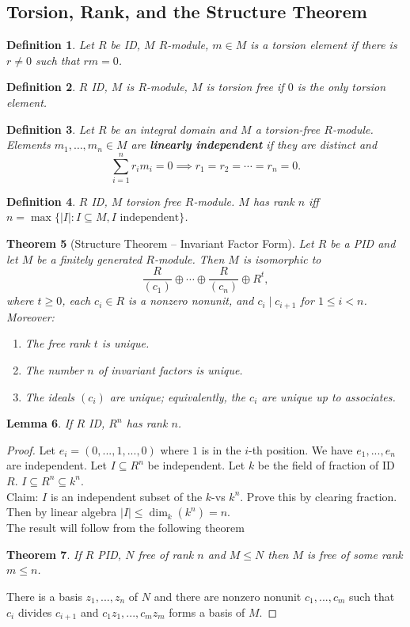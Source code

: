 \documentclass[a4paper,12pt]{article}
\newtheorem{thm}{Theorem}[section]
\newtheorem{lem}[thm]{Lemma}
\newtheorem{defn}[thm]{Definition}
\begin{document}
\subsection{Torsion, Rank, and the Structure Theorem}
\begin{defn}
    Let $R$ be ID, $M$ $R$-module, $m\in M$ is a torsion element if there is $r\neq 0$ such that $rm=0$. 
\end{defn}
\begin{defn}
    $R$ ID, $M$ is $R$-module, $M$ is torsion free if $0$ is the only torsion element. 
\end{defn}
\begin{defn}
    Let $R$ be an integral domain and $M$ a torsion-free $R$-module. Elements $m_1,\dots,m_n\in M$ are \textbf{linearly independent} if they are distinct and
    \[
    \sum_{i=1}^n r_i m_i=0 \implies r_1=r_2=\cdots=r_n=0.
    \]
\end{defn}
\begin{defn}
    $R$ ID, $M$ torsion free $R$-module. $M$ has rank $n$ iff $n=\max \{|I|:I\subseteq M, I \text{ independent}\}$. 
\end{defn}
\begin{thm}[Structure Theorem -- Invariant Factor Form]
    Let $R$ be a PID and let $M$ be a finitely generated $R$-module. Then $M$ is isomorphic to 
    \[
    \frac{R}{(c_1)}\oplus \cdots \oplus \frac{R}{(c_n)}\oplus R^t,
    \]
    where $t\geq 0$, each $c_i\in R$ is a nonzero nonunit, and $c_i\mid c_{i+1}$ for $1\leq i< n$.
    Moreover:
    \begin{enumerate}
        \item The free rank $t$ is unique.
        \item The number $n$ of invariant factors is unique.
        \item The ideals $(c_i)$ are unique; equivalently, the $c_i$ are unique up to associates. 
    \end{enumerate}
\end{thm}

\begin{lem}
    If $R$ ID, $R^n$ has rank $n$. 
\end{lem}
\begin{proof}
    Let $e_i= (0,...,1,...,0)$ where $1$ is in the $i$-th position. We have $e_1,...,e_n$ are independent. Let $I\subseteq R^n$ be independent. Let $k$ be the field of fraction of ID $R$. $I\subseteq R^n\subseteq k^n$.\\ 
    Claim: $I$ is an independent subset of the $k$-vs $k^n$. Prove this by clearing fraction.\\
    Then by linear algebra $|I|\leq \dim_k(k^n)=n.$ \\
    The result will follow from the following theorem 
    \begin{thm}
        If $R$ PID, $N$ free of rank $n$ and $M\leq N$ then $M$ is free of some rank $m\leq n$. 
    \end{thm}
    \noindent There is a basis $z_1,...,z_n$ of $N$ and there are nonzero nonunit $c_1,...,c_m$ such that $c_i$ divides $c_{i+1}$ and $c_1z_1,...,c_mz_m$ forms a basis of $M$. 
\end{proof}
\newpage
\end{document}
